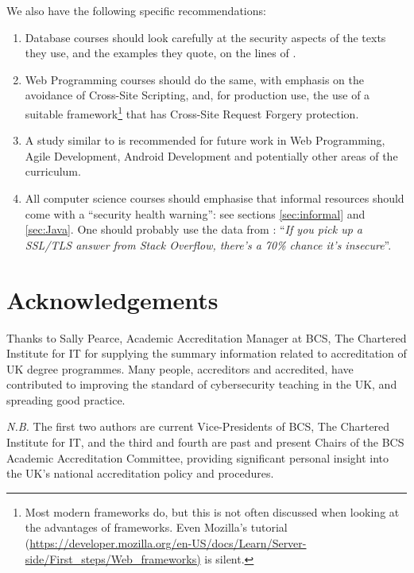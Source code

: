 \documentclass[conference]{IEEEtran}
\begin{document}
We also have the following specific recommendations:

\begin{enumerate}
\item Database courses should look carefully at the security aspects of the texts they use, and the examples they quote, on the lines of \cite{Drop2019}.
\item Web Programming courses should  do the same, with emphasis on the avoidance of Cross-Site Scripting, and, for production use, the use of a suitable framework\footnote{Most modern frameworks do, but this is not often discussed when looking at the advantages of frameworks. Even Mozilla's tutorial (\url{https://developer.mozilla.org/en-US/docs/Learn/Server-side/First_steps/Web_frameworks)} is silent.} that has Cross-Site Request Forgery protection. 
\item A study similar to \cite{Drop2019} is recommended for future work in Web Programming, Agile Development, Android Development and potentially other areas of the curriculum.
\item All computer science courses should emphasise that informal resources should come with a ``security health warning'': see sections \ref{sec:informal} and \ref{sec:Java}. One should probably use the data from \cite{Chenetal2019a}: ``{\emph{If you pick up a SSL/TLS answer from Stack Overflow, there's a 70\% chance it's insecure}}''.
\end{enumerate}

\section*{Acknowledgements}
Thanks to Sally Pearce, Academic Accreditation Manager at BCS, The Chartered Institute for IT for supplying the summary information related to accreditation of UK degree programmes. Many people, accreditors and accredited, have contributed to improving the standard of cybersecurity teaching in the UK, and spreading good practice.
\par
{\emph{N.B.}} The first two authors are current Vice-Presidents of BCS, The Chartered Institute for IT, and the third and fourth are past and present Chairs of the BCS Academic Accreditation Committee, providing significant personal insight into the UK's national accreditation policy and procedures.



 
\end{document}
